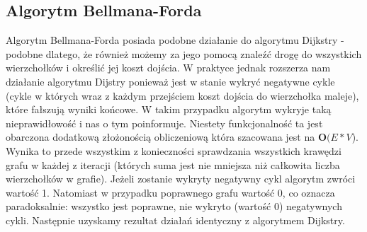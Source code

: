 \documentclass[10pt,a4paper]{article} %
\begin{document}
	\subsection{Algorytm Bellmana-Forda}
	Algorytm Bellmana-Forda posiada podobne działanie do algorytmu Dijkstry - podobne dlatego, że również możemy za jego pomocą znaleźć drogę do wszystkich wierzchołków i określić jej koszt dojścia. W praktyce jednak rozszerza nam działanie algorytmu Dijstry ponieważ jest w stanie wykryć negatywne cykle (cykle w których wraz z każdym przejściem koszt dojścia do wierzchołka maleje), które fałszują wyniki końcowe. W takim przypadku algorytm wykryje taką nieprawidłowość i nas o tym poinformuje. Niestety funkcjonalność ta jest obarczona dodatkową złożonością obliczeniową która szacowana jest na $\textbf{O}(E*V$). Wynika to przede wszystkim z konieczności sprawdzania wszystkich krawędzi grafu w każdej z iteracji (których suma jest nie mniejsza niż całkowita liczba wierzchołków w grafie). Jeżeli zostanie wykryty negatywny cykl algorytm zwróci wartość 1. Natomiast w przypadku poprawnego grafu wartość 0, co oznacza paradoksalnie: wszystko jest poprawne, nie wykryto (wartość 0) negatywnych cykli. Następnie uzyskamy rezultat działań identyczny z algorytmem Dijkstry.
	\clearpage
\end{document}
